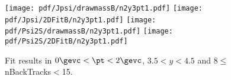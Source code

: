 \begin{figure}[H]
\begin{center}
\texttt{[image: pdf/Jpsi/drawmassB/n2y3pt1.pdf]}
\texttt{[image: pdf/Jpsi/2DFitB/n2y3pt1.pdf]}
\vspace*{-0.5cm}
\texttt{[image: pdf/Psi2S/drawmassB/n2y3pt1.pdf]}
\texttt{[image: pdf/Psi2S/2DFitB/n2y3pt1.pdf]}
\vspace*{-0.5cm}
\end{center}
\caption{Fit results in $0\gevc<\pt<2\gevc$, $3.5<y<4.5$ and 8$\leq$nBackTracks$<$15.}
\label{Fitn2y3pt1}
\end{figure}

